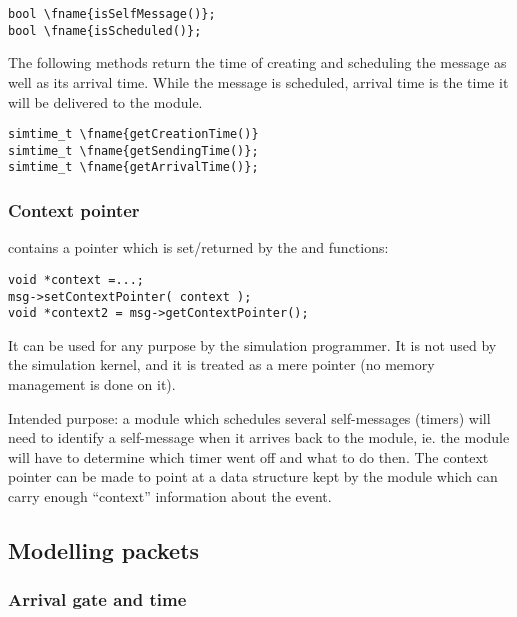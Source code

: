 \begin{Verbatim}[commandchars=\\\{\}]
bool \fname{isSelfMessage()};
bool \fname{isScheduled()};
\end{Verbatim}

The following methods return the time of creating and scheduling the message
as well as its arrival time. While the message is scheduled, arrival
time is the time it will be delivered to the module.

\begin{Verbatim}[commandchars=\\\{\}]
simtime_t \fname{getCreationTime()}
simtime_t \fname{getSendingTime()};
simtime_t \fname{getArrivalTime()};
\end{Verbatim}

\subsubsection{Context pointer}

 contains a  pointer which is
set/returned by the  and
 functions:

\begin{verbatim}
void *context =...;
msg->setContextPointer( context );
void *context2 = msg->getContextPointer();
\end{verbatim}


It can be used for any purpose by the simulation programmer.
It is not used by the simulation kernel, and it is treated as
a mere pointer (no memory management is done on it).

Intended purpose: a module which schedules several self-messages
(timers) will need to identify a self-message when it arrives back to
the module, ie. the module will have to determine which timer went off
and what to do then. The context pointer can be
made to point at a data structure kept by the module which can carry
enough ``context'' information about the event.



\subsection{Modelling packets}

\subsubsection{Arrival gate and time}

